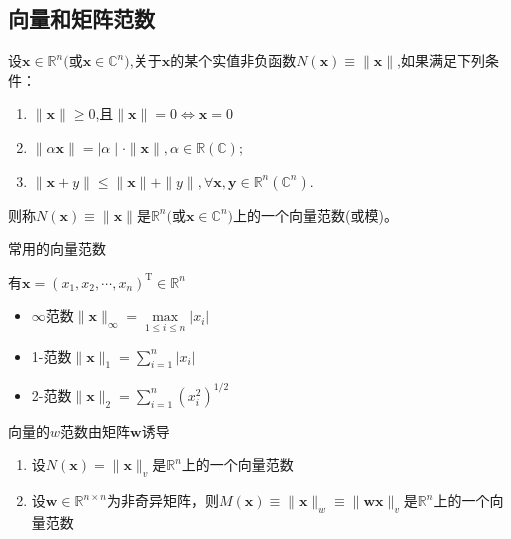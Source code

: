 \subsection{向量和矩阵范数}
\begin{definition}
    设$\boldsymbol{x}\in\mathbb{R}^n($或$\boldsymbol{x}\in\mathbb{C}^n)$,关于$\boldsymbol{x}$的某个实值非负函数$N(\boldsymbol{x})\equiv\parallel \boldsymbol{x}\parallel$,如果满足下列条件：
    \begin{enumerate}
        \item $\| \boldsymbol{x}\| \geq 0$,且$\|\boldsymbol{x}\|=0\Leftrightarrow \boldsymbol{x}=0$
        \item $\| \alpha \boldsymbol{x}\| = | \alpha \mid \cdot \| \boldsymbol{x}\| , \alpha \in \mathbb{R} ( \mathbb{C} ) ;$
        \item $\| \boldsymbol{x}+ y\| \leq \| \boldsymbol{x}\| + \| y\| , \forall \boldsymbol{x}, \boldsymbol{y}\in \mathbb{R} ^n( \mathbb{C}^n) .$
    \end{enumerate}
    则称$N(\boldsymbol{x})\equiv\parallel \boldsymbol{x}\parallel$是$\mathbb{R}^n($或$\boldsymbol{x}\in\mathbb{C}^n)$上的一个向量范数(或模)。
\end{definition}
\begin{note}
    常用的向量范数

    有$\boldsymbol{x} = \left( x_1,x_2,\cdots,x_n \right)^{\mathrm{T}}\in\mathbb{R}^n$
    
    \begin{itemize}
        \item $\infty$范数$\|\boldsymbol{x}\|_{\infty} = \max\limits_{1\leq i\leq n}|x_i|$
        \item 1-范数$\|\boldsymbol{x}\|_{1}  = \sum\limits_{i = 1}^{n}|x_i|$
        \item 2-范数$\|\boldsymbol{x}\|_{2}  = \sum\limits_{i = 1}^{n}\left( x_i^2 \right)^{1/2}$
    \end{itemize}
\end{note}
\begin{definition}[向量的$w$范数]
    向量的$w$范数由矩阵$\boldsymbol{w}$诱导
    \begin{enumerate}
        \item 设$N(\boldsymbol{x}) = \|\boldsymbol{x}\|_{v}$是$\mathbb{R}^{n}$上的一个向量范数
        \item 设$\boldsymbol{w}\in\mathbb{R}^{n\times n}$为非奇异矩阵，则$M(\boldsymbol{x})\equiv\|\boldsymbol{x}\|_{w}\equiv \|\boldsymbol{wx}\|_{v}$是$\mathbb{R}^n$上的一个向量范数
    \end{enumerate}
\end{definition}
